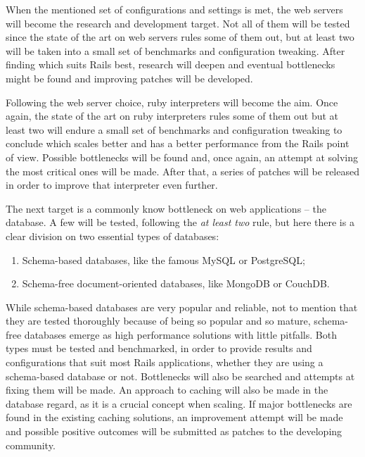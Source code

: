 When the mentioned set of configurations and settings is met, the web servers will become the research and development target. Not all of them will be tested since the state of the art on web servers rules some of them out, but at least two will be taken into a small set of benchmarks and configuration tweaking. After finding which suits Rails best, research will deepen and eventual bottlenecks might be found and improving patches will be developed.

Following the web server choice, ruby interpreters will become the aim. Once again, the state of the art on ruby interpreters rules some of them out but at least two will endure a small set of benchmarks and configuration tweaking to conclude which scales better and has a better performance from the Rails point of view. Possible bottlenecks will be found and, once again, an attempt at solving the most critical ones will be made. After that, a series of patches will be released in order to improve that interpreter even further.

The next target is a commonly know bottleneck on web applications – the database. A few will be tested, following the \textit{at least two} rule, but here there is a clear division on two essential types of databases:
\begin{enumerate}
  \item Schema-based databases, like the famous MySQL or PostgreSQL;
  \item Schema-free document-oriented databases, like MongoDB or CouchDB.
\end{enumerate}
While schema-based databases are very popular and reliable, not to mention that they are tested thoroughly because of being so popular and so mature, schema-free databases emerge as high performance solutions with little pitfalls. Both types must be tested and benchmarked, in order to provide results and configurations that suit most Rails applications, whether they are using a schema-based database or not. Bottlenecks will also be searched and attempts at fixing them will be made. An approach to caching will also be made in the database regard, as it is a crucial concept when scaling. If major bottlenecks are found in the existing caching solutions, an improvement attempt will be made and possible positive outcomes will be submitted as patches to the developing community.

